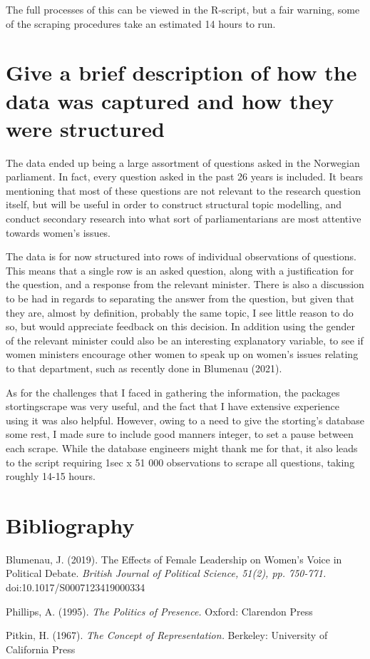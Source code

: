 \documentclass[12pt]{article}
\begin{document}
The full processes of this can be viewed in the R-script, but a fair warning, some of the scraping procedures take an estimated 14 hours to run. 

\section{Give a brief description of how the data was captured and how they were structured}

The data ended up being a large assortment of questions asked in the Norwegian parliament. In fact, every question asked in the past 26 years is included. It bears mentioning that most of these questions are not relevant to the research question itself, but will be useful in order to construct structural topic modelling, and conduct secondary research into what sort of parliamentarians are most attentive towards women's issues. 

The data is for now structured into rows of individual observations of questions. This means that a single row is an asked question, along with a justification for the question, and a response from the relevant minister. There is also a discussion to be had in regards to separating the answer from the question, but given that they are, almost by definition, probably the same topic, I see little reason to do so, but would appreciate feedback on this decision. In addition using the gender of the relevant minister could also be an interesting explanatory variable, to see if women ministers encourage other women to speak up on women's issues relating to that department, such as recently done in Blumenau (2021). 

As for the challenges that I faced in gathering the information, the packages stortingscrape was very useful, and the fact that I have extensive experience using it was also helpful. However, owing to a need to give the storting's database some rest, I made sure to include good manners integer, to set a pause between each scrape. While the database engineers might thank me for that, it also leads to the script requiring 1sec x 51 000 observations to scrape all questions, taking roughly 14-15 hours. 

\section{Bibliography}

{\parindent-10pt
Blumenau, J. (2019). The Effects of Female Leadership on Women’s Voice in
Political Debate. \textit{British Journal of Political Science, 51(2), pp. 750-771.} doi:10.1017/S0007123419000334 
	
Phillips, A. (1995). \textit{The Politics of Presence.} Oxford: Clarendon Press

Pitkin, H. (1967). \textit{The Concept of Representation.} Berkeley: University of California Press

}
\end{document}
